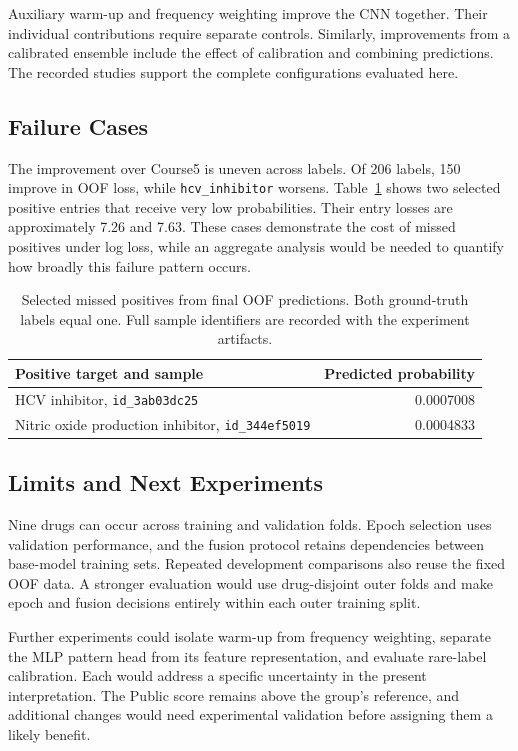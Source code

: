 \documentclass[journal]{IEEEtran}
\begin{document}
Auxiliary warm-up and frequency weighting improve the CNN together. Their individual contributions require separate controls. Similarly, improvements from a calibrated ensemble include the effect of calibration and combining predictions. The recorded studies support the complete configurations evaluated here.

\subsection{Failure Cases}
The improvement over Course5 is uneven across labels. Of 206 labels, 150 improve in OOF loss, while \texttt{hcv\_inhibitor} worsens. Table~\ref{tab:failures} shows two selected positive entries that receive very low probabilities. Their entry losses are approximately 7.26 and 7.63. These cases demonstrate the cost of missed positives under log loss, while an aggregate analysis would be needed to quantify how broadly this failure pattern occurs.

\begin{table}[!t]
\caption{Selected missed positives from final OOF predictions. Both ground-truth labels equal one. Full sample identifiers are recorded with the experiment artifacts.}
\label{tab:failures}
\centering
\begin{tabularx}{\columnwidth}{>{\raggedright\arraybackslash}Xr}
\toprule
\textbf{Positive target and sample} & \textbf{Predicted probability}\\
\midrule
HCV inhibitor, \texttt{id\_3ab03dc25} & 0.0007008\\
Nitric oxide production inhibitor, \texttt{id\_344ef5019} & 0.0004833\\
\bottomrule
\end{tabularx}
\end{table}

\subsection{Limits and Next Experiments}
Nine drugs can occur across training and validation folds. Epoch selection uses validation performance, and the fusion protocol retains dependencies between base-model training sets. Repeated development comparisons also reuse the fixed OOF data. A stronger evaluation would use drug-disjoint outer folds and make epoch and fusion decisions entirely within each outer training split.

Further experiments could isolate warm-up from frequency weighting, separate the MLP pattern head from its feature representation, and evaluate rare-label calibration. Each would address a specific uncertainty in the present interpretation. The Public score remains above the group's reference, and additional changes would need experimental validation before assigning them a likely benefit.
\end{document}
